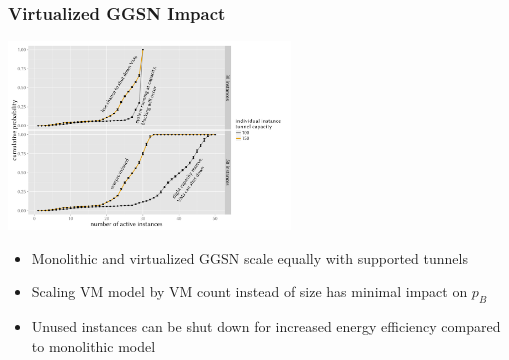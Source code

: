 \documentclass{beamer}
\begin{document}
\begin{frame}
	\frametitle{Virtualized GGSN Impact}

	\begin{center}
		\includegraphics[height=5cm]{extras/R-virtualized-instanceuse.pdf}
	\end{center}

	\begin{itemize}
		\item Monolithic and virtualized GGSN scale equally with supported tunnels
		\item Scaling VM model by VM count instead of size has minimal impact on $p_B$
		\item Unused instances can be shut down for increased energy efficiency compared to monolithic model
	\end{itemize}
\end{frame}
\end{document}
